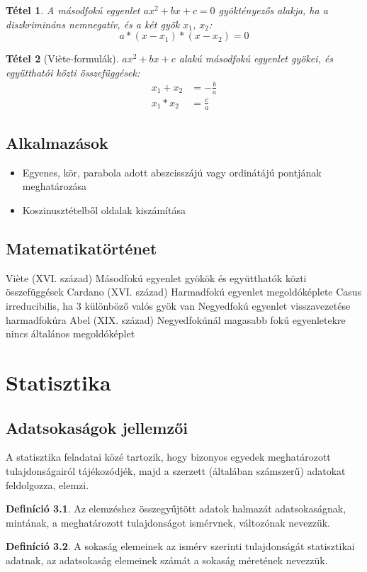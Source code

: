 \documentclass[twoside,12pt]{report}
\newtheorem{theorem}{Tétel}[section]
\theoremstyle{definition}
\newtheorem{definition}[theorem]{Definíció}
\begin{document}
	\begin{theorem}
		A másodfokú egyenlet $ax^2+bx+c=0$ gyöktényezős alakja, ha a diszkrimináns nemnegatív, és a két gyök $x_1$, $x_2$:
		\begin{equation*}
			a*(x-x_1)*(x-x_2)=0
		\end{equation*}
	\end{theorem}
	\begin{theorem}[Vi\`ete-formulák]
		$ax^2+bx+c$ alakú másodfokú egyenlet gyökei, és együtthatói közti összefüggések:
		\begin{align*}
			x_1+x_2&=-\frac{b}{a}\\
			x_1*x_2&=\frac{c}{a}
		\end{align*}
	\end{theorem}
\section{Alkalmazások}
	\begin{itemize}
		\item Egyenes, kör, parabola adott abszcisszájú vagy ordinátájú pontjának meghatározása
		\item Koszinusztételből oldalak kiszámítása
	\end{itemize}
\section{Matematikatörténet}
	\begin{outline}
		\1 Vi\`ete (XVI. század)
			\2 Másodfokú egyenlet gyökök és együtthatók közti összefüggések
		\1 Cardano (XVI. század)
			\2 Harmadfokú egyenlet megoldóképlete
				\3 Casus irreducibilis, ha 3 különböző valós gyök van
			\2 Negyedfokú egyenlet visszavezetése harmadfokúra
		\1 Abel (XIX. század)
			\2 Negyedfokúnál magasabb fokú egyenletekre nincs általános megoldóképlet
	\end{outline}
\chapter{Statisztika}
\section{Adatsokaságok jellemzői}
	A statisztika feladatai közé tartozik, hogy bizonyos egyedek meghatározott tulajdonságairól
	tájékozódjék, majd a szerzett (általában számszerű) adatokat feldolgozza, elemzi.
	\begin{definition}
		Az	elemzéshez összegyűjtött adatok halmazát adatsokaságnak, mintának, a meghatározott tulajdonságot ismérvnek, változónak nevezzük.
	\end{definition}
	\begin{definition}
		A sokaság elemeinek az ismérv szerinti tulajdonságát statisztikai adatnak, az adatsokaság elemeinek számát a sokaság méretének nevezzük.
	\end{definition}
\end{document}
